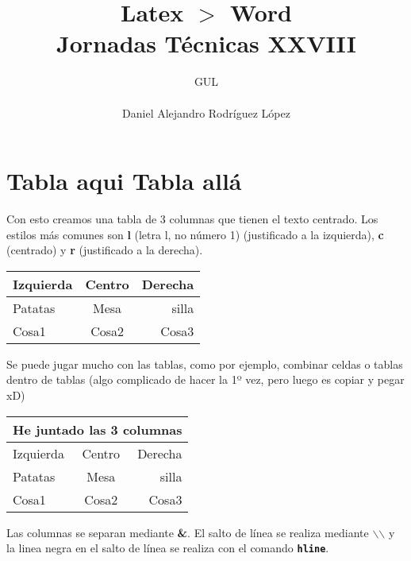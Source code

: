 \documentclass[10pt,a4paper,titlepage]{article} %
\title{ \textbf{ \Huge{Latex $>$ Word}} \\ Jornadas Técnicas XXVIII}
\author{
		\begin{tabular}{l}
			\multicolumn{1}{l}{GUL} \\ \hline \\
			Daniel Alejandro Rodríguez López \\
		\end{tabular}
}
\begin{document}
\maketitle
\newpage

\tableofcontents
\newpage

	\section{Tabla aqui Tabla allá}
	Con esto creamos una tabla de 3 columnas que tienen el texto centrado. Los estilos más comunes son \textbf{l} (letra l, no número 1) (justificado a la izquierda), \textbf{c} (centrado) y \textbf{r} (justificado a la derecha). 

	\begin{center}
	\begin{tabular}{l c r}
	Izquierda & Centro & Derecha \\ \hline
	Patatas & Mesa & silla \\
	Cosa1 & Cosa2 & Cosa3 \\ \hline
	\end{tabular}
	\end{center}


	Se puede jugar mucho con las tablas, como por ejemplo, combinar celdas o tablas dentro de tablas (algo complicado de hacer la 1º vez, pero luego es copiar y pegar xD)

	\begin{center}
	\begin{tabular}{l c r}
	\multicolumn{3}{c}{He juntado las 3 columnas} \\ \hline
	Izquierda & Centro & Derecha \\ \hline
	Patatas & Mesa & silla \\
	Cosa1 & Cosa2 & Cosa3 \\ \hline
	\end{tabular}
	\end{center}


	Las columnas se separan mediante \textbf{\&}. El salto de línea se realiza mediante \textbf{$\backslash$$\backslash$} y la linea negra en el salto de línea se realiza con el comando \textbf{\texttt{hline}}.
\end{document}
